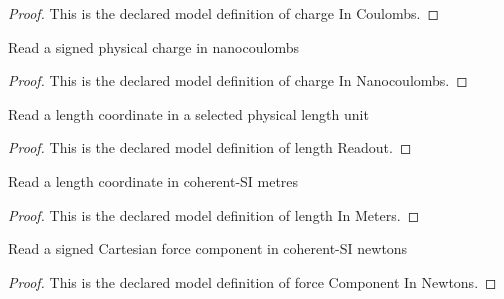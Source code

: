 \begin{proof}
  This is the declared model definition of charge In Coulombs.
\end{proof}
\begin{definition}
  \label{def:physics:phyx-mini-0897:phyxminiproblems-problemphyxmini0897-chargeinnanocoulombs}
  Read a signed physical charge in nanocoulombs
\end{definition}
\begin{proof}
  This is the declared model definition of charge In Nanocoulombs.
\end{proof}
\begin{definition}
  \label{def:physics:phyx-mini-0897:phyxminiproblems-problemphyxmini0897-lengthreadout}
  Read a length coordinate in a selected physical length unit
\end{definition}
\begin{proof}
  This is the declared model definition of length Readout.
\end{proof}
\begin{definition}
  \label{def:physics:phyx-mini-0897:phyxminiproblems-problemphyxmini0897-lengthinmeters}
  Read a length coordinate in coherent-SI metres
\end{definition}
\begin{proof}
  This is the declared model definition of length In Meters.
\end{proof}
\begin{definition}
  \label{def:physics:phyx-mini-0897:phyxminiproblems-problemphyxmini0897-forcecomponentinnewtons}
  Read a signed Cartesian force component in coherent-SI newtons
\end{definition}
\begin{proof}
  This is the declared model definition of force Component In Newtons.
\end{proof}
